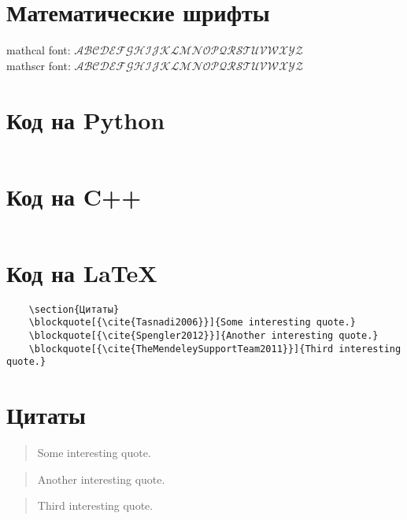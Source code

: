 \section{Математические шрифты}

mathcal font: $\mathcal{ABCDEFGHIJKLMNOPQRSTUVWXYZ}$\\
mathscr font: $\mathscr{ABCDEFGHIJKLMNOPQRSTUVWXYZ}$

\section{Код на Python}
\inputminted{python}{python_example.py}

\section{Код на C++}
\inputminted{c++}{cpp_example.cpp}

\section{Код на \LaTeX}
\begin{verbatim}
    \section{Цитаты}
    \blockquote[{\cite{Tasnadi2006}}]{Some interesting quote.}
    \blockquote[{\cite{Spengler2012}}]{Another interesting quote.}
    \blockquote[{\cite{TheMendeleySupportTeam2011}}]{Third interesting quote.}
\end{verbatim}

\section{Цитаты}
\blockquote[{\cite{Tasnadi2006}}]{Some interesting quote.}

\blockquote[{\cite{Spengler2012}}]{Another interesting quote.}

\blockquote[{\cite{TheMendeleySupportTeam2011}}]{Third interesting quote.}

